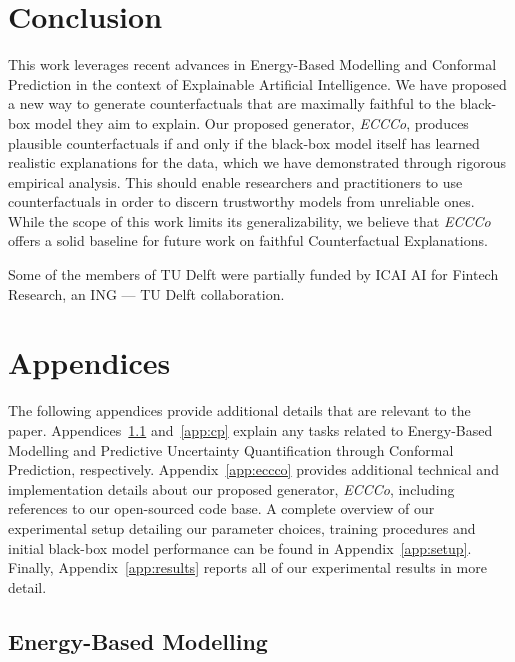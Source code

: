 \documentclass{article}
\begin{document}
\section{Conclusion}

This work leverages recent advances in Energy-Based Modelling and Conformal Prediction in the context of Explainable Artificial Intelligence. We have proposed a new way to generate counterfactuals that are maximally faithful to the black-box model they aim to explain. Our proposed generator, \textit{ECCCo}, produces plausible counterfactuals if and only if the black-box model itself has learned realistic explanations for the data, which we have demonstrated through rigorous empirical analysis. This should enable researchers and practitioners to use counterfactuals in order to discern trustworthy models from unreliable ones. While the scope of this work limits its generalizability, we believe that \textit{ECCCo} offers a solid baseline for future work on faithful Counterfactual Explanations.

\begin{ack}

Some of the members of TU Delft were partially funded by ICAI AI for Fintech Research, an ING — TU Delft
collaboration.

\end{ack}



\appendix
\section*{Appendices}
\renewcommand{\thesubsection}{\Alph{subsection}}

The following appendices provide additional details that are relevant to the paper. Appendices~\ref{app:jem} and~\ref{app:cp} explain any tasks related to Energy-Based Modelling and Predictive Uncertainty Quantification through Conformal Prediction, respectively. Appendix~\ref{app:eccco} provides additional technical and implementation details about our proposed generator, \textit{ECCCo}, including references to our open-sourced code base. A complete overview of our experimental setup detailing our parameter choices, training procedures and initial black-box model performance can be found in Appendix~\ref{app:setup}. Finally, Appendix~\ref{app:results} reports all of our experimental results in more detail.

\subsection{Energy-Based Modelling}\label{app:jem}
\end{document}
